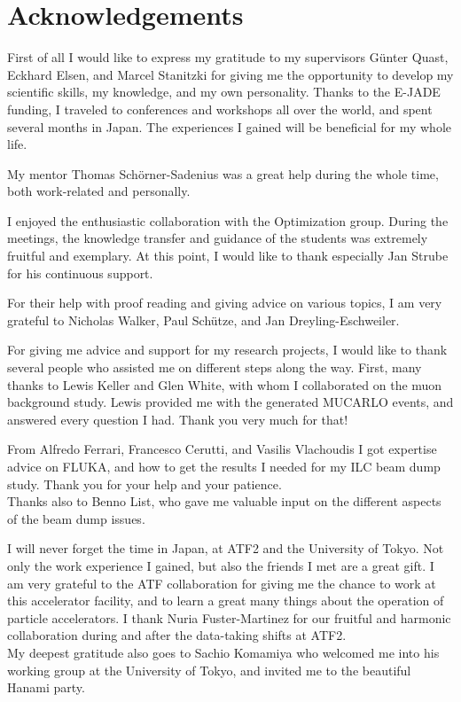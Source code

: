 \chapter*{Acknowledgements}

First of all I would like to express my gratitude to my supervisors G\"unter Quast, Eckhard Elsen, and Marcel Stanitzki for giving me the opportunity to develop my scientific skills, my knowledge, and my own personality.
Thanks to the E-JADE funding, I traveled to conferences and workshops all over the world, and spent several months in Japan.
The experiences I gained will be beneficial for my whole life.

\noindent My mentor Thomas Sch\"orner-Sadenius was a great help during the whole time, both work-related and personally.

\noindent I enjoyed the enthusiastic collaboration with the \sid Optimization group.
During the meetings, the knowledge transfer and guidance of the students was extremely fruitful and exemplary.
At this point, I would like to thank especially Jan Strube for his continuous support.

\noindent For their help with proof reading and giving advice on various topics, I am very grateful to Nicholas Walker, Paul Sch\"utze, and Jan Dreyling-Eschweiler.

\noindent For giving me advice and support for my research projects, I would like to thank several people who assisted me on different steps along the way.
First, many thanks to Lewis Keller and Glen White, with whom I collaborated on the muon background study.
Lewis provided me with the generated MUCARLO events, and answered every question I had.
Thank you very much for that!

\noindent From Alfredo Ferrari, Francesco Cerutti, and Vasilis Vlachoudis I got expertise advice on FLUKA, and how to get the results I needed for my ILC beam dump study.
Thank you for your help and your patience.
\\Thanks also to Benno List, who gave me valuable input on the different aspects of the beam dump issues.

\noindent I will never forget the time in Japan, at ATF2 and the University of Tokyo.
Not only the work experience I gained, but also the friends I met are a great gift.
I am very grateful to the ATF collaboration for giving me the chance to work at this accelerator facility, and to learn a great many things about the operation of particle accelerators.
I thank Nuria Fuster-Martinez for our fruitful and harmonic collaboration during and after the data-taking shifts at ATF2.
\\My deepest gratitude also goes to Sachio Komamiya who welcomed me into his working group at the University of Tokyo, and invited me to the beautiful Hanami party.

